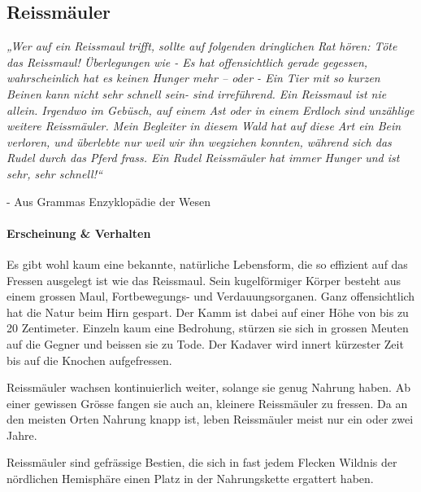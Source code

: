 \documentclass[12pt,twoside,twocolumn,openany]{book}
\begin{document}

\subsection{Reissmäuler}
\begin{quotebox}
	\textit{„Wer auf ein Reissmaul trifft, sollte auf folgenden dringlichen Rat hören: Töte das Reissmaul! 
		Überlegungen wie - Es hat offensichtlich gerade gegessen, wahrscheinlich hat es keinen Hunger mehr – oder - Ein Tier mit so kurzen Beinen kann nicht sehr schnell sein- sind irreführend. Ein Reissmaul ist nie allein. Irgendwo im Gebüsch, auf einem Ast oder in einem Erdloch sind unzählige weitere Reissmäuler. Mein Begleiter in diesem Wald hat auf diese Art ein Bein verloren, und überlebte nur weil wir ihn wegziehen konnten, während sich das Rudel durch das Pferd frass. Ein Rudel Reissmäuler hat immer Hunger und ist sehr, sehr schnell!“}
	\begin{flushright}
		- Aus Grammas Enzyklopädie der Wesen
	\end{flushright}
\end{quotebox}

\paragraph{Erscheinung \& Verhalten}
Es gibt wohl kaum eine bekannte, natürliche Lebensform, die so effizient auf das Fressen ausgelegt ist wie das Reissmaul. Sein kugelförmiger Körper besteht aus einem grossen Maul, Fortbewegungs- und Verdauungsorganen. Ganz offensichtlich hat die Natur beim Hirn gespart. Der Kamm ist dabei auf einer Höhe von bis zu 20 Zentimeter. Einzeln kaum eine Bedrohung, stürzen sie sich in grossen Meuten auf die Gegner und beissen sie zu Tode. Der Kadaver wird innert kürzester Zeit bis auf die Knochen aufgefressen.

Reissmäuler wachsen kontinuierlich weiter, solange sie genug Nahrung haben. Ab einer gewissen Grösse fangen sie auch an, kleinere Reissmäuler zu fressen. Da an den meisten Orten Nahrung knapp ist, leben Reissmäuler meist nur ein oder zwei Jahre.

Reissmäuler sind gefrässige Bestien, die sich in fast jedem Flecken Wildnis der nördlichen Hemisphäre einen Platz in der Nahrungskette ergattert haben.
\end{document}
